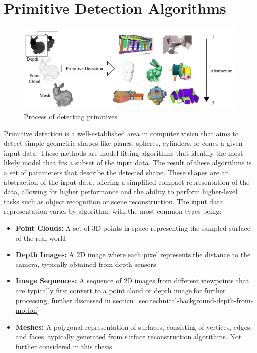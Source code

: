 \chapter{Primitive Detection Algorithms}

\begin{figure}[ht!]
    \centering
    \includegraphics[width=\linewidth]{images/primitive_detection}
    \caption{Process of detecting primitives}
    \label{fig:primitive_detection}
\end{figure}
Primitive detection is a well-established area in computer vision that aims to detect simple geometric shapes
like planes, spheres, cylinders, or cones a given input data.
These methods are model-fitting algorithms that identify the most likely model that fits a subset of the input data.
The result of these algorithms is a set of parameters that describe the detected shape.
These shapes are an abstraction of the input data, offering a simplified compact representation of the data,
allowing for higher performance and the ability to perform higher-level tasks such as object recognition or scene reconstruction.
The input data representation varies by algorithm, with the most common types being:
\begin{itemize}
    \item \textbf{Point Clouds:} A set of 3D points in space representing the sampled surface of the real-world
    \item \textbf{Depth Images:} A 2D image where each pixel represents the distance to the camera, typically obtained from depth sensors
    \item \textbf{Image Sequences:} A sequence of 2D images from different viewpoints that are typically first convert to a point cloud or depth image for further processing, further discussed in section~\ref{sec:technical-background-depth-from-motion}
    \item \textbf{Meshes:} A polygonal representation of surfaces, consisting of vertices, edges, and faces, typically generated from surface reconstruction algorithms. Not further considered in this thesis. \cite{kaiser_survey_2019}
\end{itemize}

